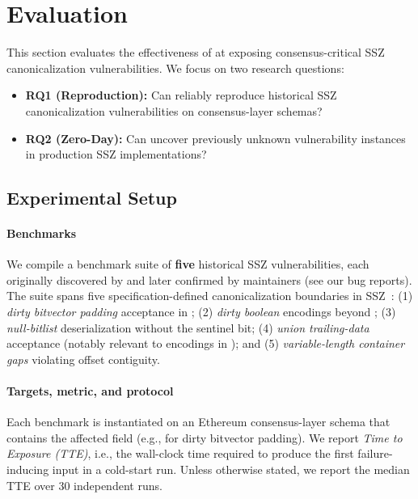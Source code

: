 \section{Evaluation}\label{sec:eval}

This section evaluates the effectiveness of \tool at exposing consensus-critical SSZ canonicalization vulnerabilities.
We focus on two research questions:
\begin{itemize}
    \item \textbf{RQ1 (Reproduction):} Can \tool reliably reproduce historical SSZ canonicalization vulnerabilities on consensus-layer schemas?
    \item \textbf{RQ2 (Zero-Day):} Can \tool uncover previously unknown vulnerability instances in production SSZ implementations?
\end{itemize}

\subsection{Experimental Setup}

\paragraph{Benchmarks}
We compile a benchmark suite of \textbf{five} historical SSZ vulnerabilities, each originally discovered by \tool and later confirmed by maintainers (see our bug reports).
The suite spans five specification-defined canonicalization boundaries in SSZ~\cite{sszspec}:
(1) \emph{dirty bitvector padding} acceptance in ;
(2) \emph{dirty boolean} encodings beyond ;
(3) \emph{null-bitlist} deserialization without the sentinel bit;
(4) \emph{union trailing-data} acceptance (notably relevant to  encodings in \cite{eip6800}); and
(5) \emph{variable-length container gaps} violating offset contiguity.

\paragraph{Targets, metric, and protocol}
Each benchmark is instantiated on an Ethereum consensus-layer schema that contains the affected field (e.g.,  for dirty bitvector padding).
We report \emph{Time to Exposure (TTE)}, i.e., the wall-clock time required to produce the first failure-inducing input in a cold-start run.
Unless otherwise stated, we report the median TTE over 30 independent runs.

